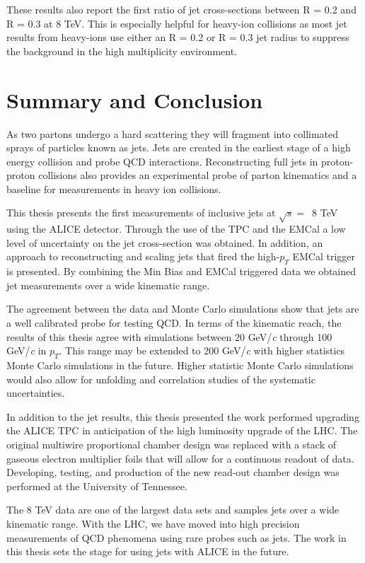 These results also report the first ratio of jet cross-sections between R = 0.2 and R = 0.3 at 8 TeV.  This is especially helpful for heavy-ion collisions as most jet results from heavy-ions use either an R = 0.2 or R = 0.3 jet radius to suppress the background in the high multiplicity environment.


\section{Summary and Conclusion}

As two partons undergo a hard scattering they will fragment into collimated sprays of particles known as jets.  Jets are created in the earliest stage of a high energy collision and probe QCD interactions.  Reconstructing full jets in proton-proton collisions also provides an experimental probe of parton kinematics and a baseline for measurements in heavy ion collisions.

This thesis presents the first measurements of inclusive jets at $\sqrt{s} = \,$ 8 TeV using the ALICE detector.  Through the use of the TPC and the EMCal a low level of uncertainty on the jet cross-section was obtained.  In addition, an approach to reconstructing and scaling jets that fired the high-$p_{T}$ EMCal trigger is presented.  By combining the Min Bias and EMCal triggered data we obtained jet measurements over a wide kinematic range.

The agreement between the data and Monte Carlo simulations show that jets are a well calibrated probe for testing QCD.  In terms of the kinematic reach, the results of this thesis agree with simulations between 20 GeV/\textit{c} through 100 GeV/\textit{c} in $p_{T}$.  This range may be extended to 200 GeV/\textit{c} with higher statistics Monte Carlo simulations in the future.  Higher statistic Monte Carlo simulations would also allow for unfolding and correlation studies of the systematic uncertainties.


In addition to the jet results, this thesis presented the work performed upgrading the ALICE TPC in anticipation of the high luminosity upgrade of the LHC.  The original multiwire proportional chamber design was replaced with a stack of gaseous electron multiplier foils that will allow for a continuous readout of data.  Developing, testing, and production of the new read-out chamber design was performed at the University of Tennessee.

The 8 TeV data are one of the largest data sets and samples jets over a wide kinematic range.  With the LHC, we have moved into high precision measurements of QCD phenomena using rare probes such as jets.  The work in this thesis sets the stage for using jets with ALICE in the future.  


